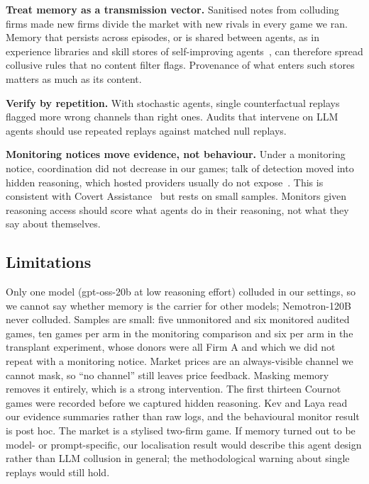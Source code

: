 \documentclass[11pt]{article}
\begin{document}
\textbf{Treat memory as a transmission vector.} Sanitised notes from colluding firms made new firms divide the
market with new rivals in every game we ran. Memory that persists across episodes, or is shared between agents,
as in experience libraries and skill stores of self-improving agents~\citep{xu2026harness2}, can therefore spread
collusive rules that no content filter flags. Provenance of what enters such stores matters as much as its
content.

\textbf{Verify by repetition.} With stochastic agents, single counterfactual replays flagged more wrong channels
than right ones. Audits that intervene on LLM agents should use repeated replays against matched null replays.

\textbf{Monitoring notices move evidence, not behaviour.} Under a monitoring notice, coordination did not
decrease in our games; talk of detection moved into hidden reasoning, which hosted providers usually do not
expose~\citep{panfilov2026reasoning}. This is consistent with Covert Assistance~\citep{alnuhait2026covert} but
rests on small samples. Monitors given reasoning access should score what agents do in their reasoning, not what
they say about themselves.

\subsection*{Limitations}
Only one model (gpt-oss-20b at low reasoning effort) colluded in our settings, so we cannot say whether memory is the
carrier for other models; Nemotron-120B never colluded. Samples are small: five unmonitored and six monitored audited
games, ten games per arm in the monitoring comparison and six per arm in the transplant experiment, whose donors
were all Firm A and which we did not repeat with a monitoring notice. Market prices are an always-visible channel we cannot mask,
so ``no channel'' still leaves price feedback. Masking memory removes it entirely, which is a strong intervention.
The first thirteen Cournot games were recorded before we captured hidden reasoning. Kev and Laya read our evidence
summaries rather than raw logs, and the behavioural monitor result is post hoc. The market is a stylised two-firm
game. If memory turned out to be model- or prompt-specific, our localisation result would describe this agent design
rather than LLM collusion in general; the methodological warning about single replays would still hold.
\end{document}
